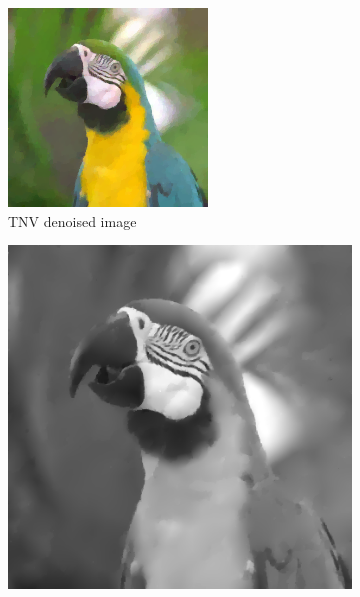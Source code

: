 \documentclass{article}
\begin{document}
\begin{figure}[htbp]
    \begin{subfigure}[b]{0.24\textwidth}
        \centering
        \includegraphics[width=\textwidth]{images/TNVdenoised_colour.png}
        \caption{TNV denoised image}
        \label{fig:TNVdenoised_colour}
    \end{subfigure}
    \begin{subfigure}[b]{0.24\textwidth}
        \centering
        \includegraphics[width=\textwidth]{images/TGVdenoised_gray.png}

\end{subfigure}
\end{figure}
\end{document}
